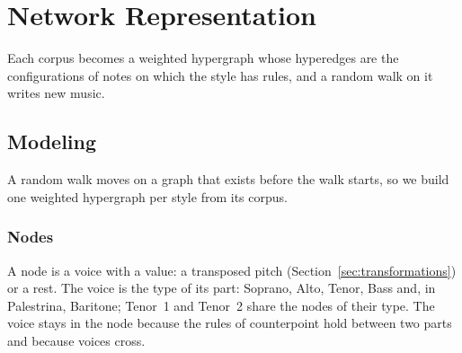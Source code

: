 \section{Network Representation}
\label{sec:representation}
Each corpus becomes a weighted hypergraph whose hyperedges are the configurations of notes on which the style has rules, and a random walk on it writes new music.
\subsection{Modeling}

A random walk moves on a graph that exists before the walk starts, so we build one weighted hypergraph per style from its corpus.

\subsubsection{Nodes}
A node is a voice with a value: a transposed pitch (Section~\ref{sec:transformations}) or a rest. The voice is the type of its part: Soprano, Alto, Tenor, Bass and, in Palestrina, Baritone; Tenor~1 and Tenor~2 share the nodes of their type. The voice stays in the node because the rules of counterpoint hold between two parts \cite{fux1725} and because voices cross.

